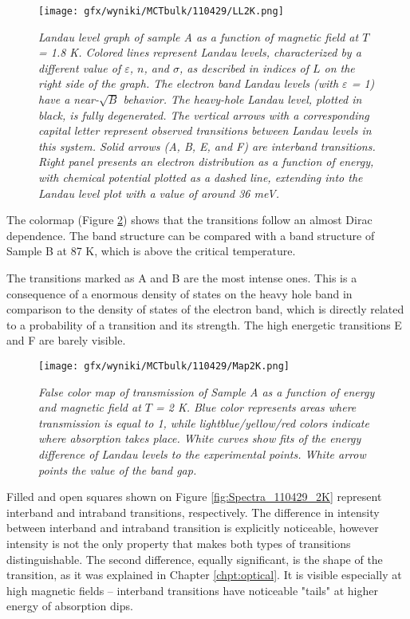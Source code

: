 \documentclass[titlepage,a4paper]{book}
\begin{document}
\begin{figure}[ht]
	\centering
	\texttt{[image: gfx/wyniki/MCTbulk/110429/LL2K.png]}
	\vspace{-10pt}
	\caption{\textit{Landau level graph of sample A as a function of magnetic field at $T$ = 1.8 K. Colored lines represent Landau levels, characterized by a different value of $\varepsilon$, $n$, and $\sigma$, as described in indices of $L$ on the right side of the graph. The electron band Landau levels (with $\varepsilon$ = 1) have a near-$\sqrt{B}$ behavior. The heavy-hole Landau level, plotted in black, is fully degenerated. The vertical arrows with a corresponding capital letter represent observed transitions between Landau levels in this system. Solid arrows (A, B, E, and F) are interband transitions. Right panel presents an electron distribution as a function of energy, with chemical potential plotted as a dashed line, extending into the Landau level plot with a value of around 36 meV.}}
	\label{fig:LL_110429_2K}
\end{figure}
The colormap (Figure \ref{fig:Map_110429_2K}) shows that the transitions follow an almost Dirac dependence. The band structure can be compared with a band structure of Sample B at 87 K, which is above the critical temperature. 

The transitions marked as A and B are the most intense ones. This is a consequence of a enormous density of states on the heavy hole band in comparison to the density of states of the electron band, which is directly related to a probability of a transition and its strength. The high energetic transitions E and F are barely visible.

\begin{figure}[ht]
	\centering
	\texttt{[image: gfx/wyniki/MCTbulk/110429/Map2K.png]}
	\vspace{-10pt}
	\caption{\textit{False color map of transmission of Sample A as a function of energy and magnetic field at $T$ = 2 K. Blue color represents areas where transmission is equal to 1, while lightblue/yellow/red colors indicate where absorption takes place. White curves show fits of the energy difference of Landau levels to the experimental points. White arrow points the value of the band gap.}}
	\label{fig:Map_110429_2K}
\end{figure} 

Filled and open squares shown on Figure \ref{fig:Spectra_110429_2K} represent interband and intraband transitions, respectively. The difference in intensity between interband and intraband transition is explicitly noticeable, however intensity is not the only property that makes both types of transitions distinguishable. The second difference, equally significant, is the shape of the transition, as it was explained in Chapter \ref{chpt:optical}. It is visible especially at high magnetic fields -- interband transitions have noticeable "tails" at higher energy of absorption dips.
\end{document}
